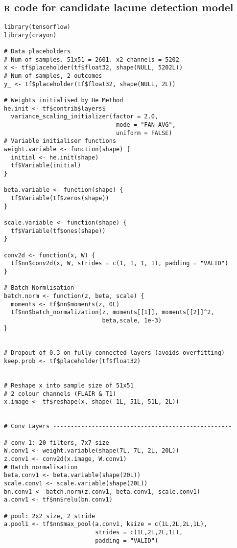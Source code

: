 %
%


\begin{appendices}
\chapter{\textsc{r} code for candidate lacune detection model}\label{app-r-code}

\begin{verbatim}
library(tensorflow)
library(crayon)

# Data placeholders
# Num of samples. 51x51 = 2601. x2 channels = 5202
x <- tf$placeholder(tf$float32, shape(NULL, 5202L))
# Num of samples, 2 outcomes
y_ <- tf$placeholder(tf$float32, shape(NULL, 2L))

# Weights initialised by He Method
he.init <- tf$contrib$layers$
  variance_scaling_initializer(factor = 2.0,
                                mode = "FAN_AVG",
                                uniform = FALSE)
# Variable initialiser functions
weight.variable <- function(shape) {
  initial <- he.init(shape)
  tf$Variable(initial)
}

beta.variable <- function(shape) {
  tf$Variable(tf$zeros(shape))
}

scale.variable <- function(shape) {
  tf$Variable(tf$ones(shape))
}

conv2d <- function(x, W) {
  tf$nn$conv2d(x, W, strides = c(1, 1, 1, 1), padding = "VALID")
}

# Batch Normlisation
batch.norm <- function(z, beta, scale) {
  moments <- tf$nn$moments(z, 0L)
  tf$nn$batch_normalization(z, moments[[1]], moments[[2]]^2,
                            beta,scale, 1e-3)
}


# Dropout of 0.3 on fully connected layers (avoids overfitting)
keep.prob <- tf$placeholder(tf$float32)


# Reshape x into sample size of 51x51
# 2 colour channels (FLAIR & T1)
x.image <- tf$reshape(x, shape(-1L, 51L, 51L, 2L))


# Conv Layers ---------------------------------------------------

# conv 1: 20 filters, 7x7 size
W.conv1 <- weight.variable(shape(7L, 7L, 2L, 20L))
z.conv1 <- conv2d(x.image, W.conv1)
# Batch normalisation
beta.conv1 <- beta.variable(shape(20L))
scale.conv1 <- scale.variable(shape(20L))
bn.conv1 <- batch.norm(z.conv1, beta.conv1, scale.conv1)
a.conv1 <- tf$nn$relu(bn.conv1)

# pool: 2x2 size, 2 stride
a.pool1 <- tf$nn$max_pool(a.conv1, ksize = c(1L,2L,2L,1L),
                          strides = c(1L,2L,2L,1L),
                          padding = "VALID")


\end{verbatim}
\end{appendices}
